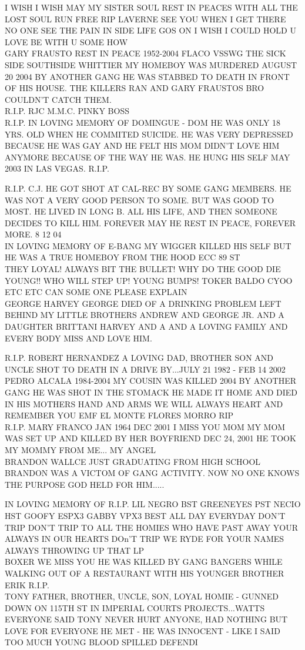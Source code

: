 \documentclass[10pt,letterpaper]{article}
\begin{document}
I WISH I WISH MAY MY SISTER SOUL REST IN PEACES WITH ALL THE LOST SOUL RUN FREE RIP LAVERNE SEE YOU WHEN I GET THERE NO ONE SEE THE PAIN IN SIDE LIFE GOS ON I WISH I COULD HOLD U LOVE BE WITH U SOME HOW\\
GARY FRAUSTO REST IN PEACE 1952{-}2004 FLACO VSSWG THE SICK SIDE SOUTHSIDE WHITTIER MY HOMEBOY WAS MURDERED AUGUST 20 2004 BY ANOTHER GANG HE WAS STABBED TO DEATH IN FRONT OF HIS HOUSE.  THE KILLERS RAN AND GARY FRAUSTOS BRO COULDN'T CATCH THEM.\\
R.I.P. RJC M.M.C. PINKY BOSS\\
R.I.P. IN LOVING MEMORY OF DOMINGUE {-} DOM HE WAS ONLY 18 YRS. OLD WHEN HE COMMITED SUICIDE.  HE WAS VERY DEPRESSED BECAUSE HE WAS GAY AND HE FELT HIS MOM DIDN'T LOVE HIM ANYMORE BECAUSE OF THE WAY HE WAS.  HE HUNG HIS SELF MAY 2003 IN LAS VEGAS.  R.I.P.

R.I.P. C.J. HE GOT SHOT AT CAL{-}REC BY SOME GANG MEMBERS.  HE WAS NOT A VERY GOOD PERSON TO SOME.  BUT WAS GOOD TO MOST.  HE LIVED IN LONG B. ALL HIS LIFE, AND THEN SOMEONE DECIDES TO KILL HIM.  FOREVER MAY HE REST IN PEACE, FOREVER MORE.  8 12 04\\
IN LOVING MEMORY OF E{-}BANG MY WIGGER KILLED HIS SELF BUT HE WAS A TRUE HOMEBOY FROM THE HOOD ECC 89 ST\\
THEY LOYAL!  ALWAYS BIT THE BULLET!  WHY DO THE GOOD DIE YOUNG!! WHO WILL STEP UP!  YOUNG BUMPS! TOKER BALDO CYOO ETC ETC CAN SOME ONE PLEASE EXPLAIN\\
GEORGE HARVEY GEORGE DIED OF A DRINKING PROBLEM LEFT BEHIND MY LITTLE BROTHERS ANDREW AND GEORGE JR. AND A DAUGHTER BRITTANI HARVEY AND A AND A LOVING FAMILY AND EVERY BODY MISS AND LOVE HIM.

R.I.P. ROBERT HERNANDEZ A LOVING DAD, BROTHER SON AND UNCLE SHOT TO DEATH IN A DRIVE BY...JULY 21 1982 {-} FEB 14 2002\\
PEDRO ALCALA 1984{-}2004 MY COUSIN WAS KILLED 2004 BY ANOTHER GANG HE WAS SHOT IN THE STOMACK HE MADE IT HOME AND DIED IN HIS MOTHERS HAND AND ARMS WE WILL ALWAYS HEART AND REMEMBER YOU EMF EL MONTE FLORES MORRO RIP\\
R.I.P. MARY FRANCO JAN 1964 DEC 2001 I MISS YOU MOM MY MOM WAS SET UP AND KILLED BY HER BOYFRIEND DEC 24, 2001 HE TOOK MY MOMMY FROM ME... MY ANGEL\\
BRANDON WALLCE JUST GRADUATING FROM HIGH SCHOOL BRANDON WAS A VICTOM OF GANG ACTIVITY.  NOW NO ONE KNOWS THE PURPOSE GOD HELD FOR HIM.....

IN LOVING MEMORY OF R.I.P. LIL NEGRO BST GREENEYES PST NECIO HST GOOFY ESPX3 GABBY VPX3 BEST ALL DAY EVERYDAY DON'T TRIP DON'T TRIP TO ALL THE HOMIES WHO HAVE PAST AWAY YOUR ALWAYS IN OUR HEARTS DOn'T TRIP WE RYDE FOR YOUR NAMES ALWAYS THROWING UP THAT LP\\
BOXER WE MISS YOU HE WAS KILLED BY GANG BANGERS WHILE WALKING OUT OF A RESTAURANT WITH HIS YOUNGER BROTHER\\
ERIK R.I.P.\\
TONY FATHER, BROTHER, UNCLE, SON, LOYAL HOMIE {-} GUNNED DOWN ON 115TH ST IN IMPERIAL COURTS PROJECTS...WATTS EVERYONE SAID TONY NEVER HURT ANYONE, HAD NOTHING BUT LOVE FOR EVERYONE HE MET {-} HE WAS INNOCENT {-} LIKE I SAID TOO MUCH YOUNG BLOOD SPILLED DEFENDI
\end{document}
